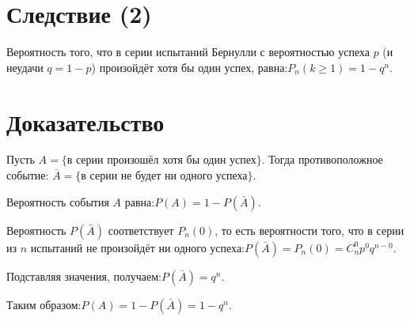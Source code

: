 \section*{Следствие (2)}
Вероятность того, что в серии испытаний Бернулли с вероятностью успеха \( p \) (и неудачи \( q = 1 - p \)) произойдёт хотя бы один успех, равна:$P_n(k \geq 1) = 1 - q^n$.

\section*{Доказательство}
Пусть \( A = \{\text{в серии произошёл хотя бы один успех}\} \).  
Тогда противоположное событие:
$\bar{A} = \{\text{в серии не будет ни одного успеха}\}$.

Вероятность события \( A \) равна:$P(A) = 1 - P(\bar{A})$.

Вероятность \( P(\bar{A}) \) соответствует \( P_n(0) \), то есть вероятности того, что в серии из \( n \) испытаний не произойдёт ни одного успеха:$P(\bar{A}) = P_n(0) = C_n^0 p^0 q^{n-0}$.

Подставляя значения, получаем:$P(\bar{A}) = q^n$.

Таким образом:$P(A) = 1 - P(\bar{A}) = 1 - q^n$.
